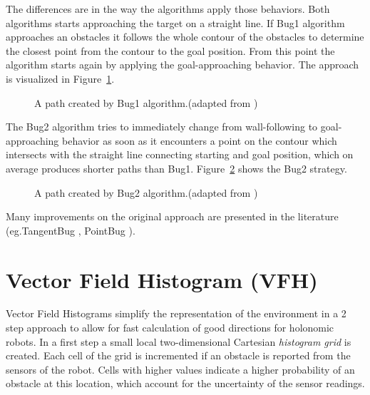 The differences are in the way the algorithms apply those behaviors.
Both algorithms starts approaching the target on a straight line.
If Bug1 algorithm approaches an obstacles it follows the whole contour of the obstacles to determine the closest point from the contour to the goal position.
From this point the algorithm starts again by applying the goal-approaching behavior.
The approach is visualized in Figure~\ref{fig:bug1}.
\begin{figure}[thpb]
	  \myfloatalign
      \footnotesize
      \centering
   \caption[Bug1]{A path created by Bug1 algorithm.(adapted from \cite{ribeiro2005obstacle})}
   \label{fig:bug1}
\end{figure}

The Bug2 algorithm tries to immediately change from wall-following to goal-approaching behavior as soon as it encounters a point on the contour which intersects with the straight line connecting starting and goal position, which on average produces shorter paths than Bug1.
Figure~\ref{fig:bug2} shows the Bug2 strategy. 

\begin{figure}[thpb]
	  \myfloatalign
      \footnotesize
      \centering
   \caption[Bug2]{A path created by Bug2 algorithm.(adapted from \cite{ribeiro2005obstacle})}
   \label{fig:bug2}
\end{figure}

Many improvements on the original approach are presented in the literature (eg.TangentBug \cite{Choset_2005_5167}, PointBug \cite{buniyamin2011simple}).

\section{Vector Field Histogram (VFH)}
Vector Field Histograms \cite{borenstein1991vector} simplify the representation of the environment in a 2 step approach to allow for fast calculation of good directions for holonomic robots.
In a first step a small local two-dimensional Cartesian \emph{histogram grid} is created.
Each cell of the grid is incremented if an obstacle is reported from the sensors of the robot. 
Cells with higher values indicate a higher probability of an obstacle at this location, which account for the uncertainty of the sensor readings. 


